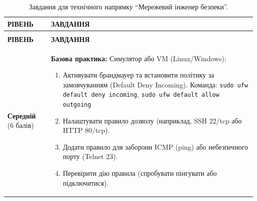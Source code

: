 \begin{longtable}{
  | >{\raggedright\arraybackslash}p{} 
  | >{\raggedright\arraybackslash}p{} |
}

\caption{Завдання для технічного напрямку ``Мережевий інженер безпеки''.}
\label{tab:lab3_tech_task} \\

\hline
\rowcolor{TableHeaderBlue}
\hfil\color{white}\textbf{РІВЕНЬ} & 
\hfil\color{white}\textbf{ЗАВДАННЯ} \\ \hline
\endfirsthead

\multicolumn{2}{r}{{Продовження табл. \thetable}} \\
\hline
\rowcolor{TableHeaderBlue}
\hfil\color{white}\textbf{РІВЕНЬ} & 
\hfil\color{white}\textbf{ЗАВДАННЯ} \\ \hline
\endhead

\hline
\endlastfoot


\rowcolor{white} %
\cellcolor{TableBodyGreen}
\small \textbf{Середній} (6 балів) &
\cellcolor{white} %
\small \textbf{Базова практика:}
Симулятор або VM (Linux/Windows):
\begin{enumerate}
    \item Активувати брандмауер та встановити політику за замовчуванням (Default Deny Incoming). Команда: \texttt{sudo ufw default deny incoming}, \texttt{sudo ufw default allow outgoing}
    \item Налаштувати правило дозволу (наприклад, SSH 22/tcp або HTTP 80/tcp).
    \item Додати правило для заборони ICMP (ping) або небезпечного порту (Telnet 23).
    \item Перевірити дію правила (спробувати пінгувати або підключитися).
\end{enumerate}
\\ \hline


\end{longtable}
